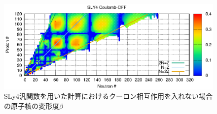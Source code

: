 \documentclass[12pt]{jarticle}
\begin{document}
\begin{figure}[H]
    \centering
    \includegraphics{../SLY4_OFF.eps}
    \setlength\floatsep{0pt}
    \caption{SLy4汎関数を用いた計算におけるクーロン相互作用を入れない場合の原子核の変形度$\beta$}\label{fig:SLY4_OFF}
\end{figure}
\end{document}
